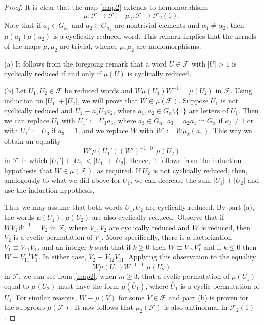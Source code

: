 \documentclass[10pt, reqno]{amsart}
\numberwithin{equation}{section}
\begin{document}
\begin{proof}
It is clear that the map \eqref{map2} extends to homomorphisms
 $$
 \mu : {\mathcal{F}} \to {\mathcal{F}} , \quad \mu_2 :  {\mathcal{F}} \to {\mathcal{F}}_2(1) .
 $$
Note that if $a_1 \in G_{{\alpha}_1}$ and $a_2 \in G_{{\alpha}_2}$ are nontrivial elements and ${\alpha}_1 \ne {\alpha}_2$, then
$\mu(a_1) \mu(a_2) $ is a cyclically reduced word. This remark implies that the kernels of the maps $\mu, \mu_2$ are trivial, whence $\mu, \mu_2$  are monomorphisms.
\smallskip

(a) It follows from the foregoing remark that  a word $U \in {\mathcal{F}}$ with $|U| >1$ is cyclically reduced if and only if $\mu(U)$ is cyclically reduced.
\smallskip

(b)  Let $U_1, U_2 \in {\mathcal{F}}$ be reduced words and
$W \mu(U_1) W^{-1} = \mu(U_2)$ in ${\mathcal{F}}$. Using induction on $|U_1| + |U_2|$, we will prove that $W \in \mu({\mathcal{F}})$. Suppose $U_1$ is not cyclically reduced and
$U_1 \equiv a_1 U_3 a_2$, where $a_1, a_2 \in G_{\alpha} \setminus \{ 1\}$ are letters of $U_1$. Then we can replace $U_1$ with $U_1' := U_3 a_3$, where $a_3 \in G_{\alpha}$,    $a_3 = a_2 a_1$ in $G_{\alpha}$ if  $a_3 \ne 1$ or with  $U_1' := U_3$ if $a_3 = 1$, and we replace $W$ with $W' := W \mu_2(a_1)$. This way we obtain an equality
$$
W' \mu(U_1') (W')^{-1} \overset 0 =  \mu(U_2)
$$
in ${\mathcal{F}}$ in which $|U_1'|+ |U_2| < |U_1| + |U_2|$. Hence, it follows from the induction hypothesis that $W \in \mu({\mathcal{F}})$, as required. If  $U_2$ is not cyclically reduced, then, analogously to what we did above for $U_1$, we can decrease the sum  $|U_1| + |U_2|$ and use the induction hypothesis.

Thus we may assume that both words $U_1, U_2$ are
cyclically reduced.  By part (a), the words $\mu(U_1)$, $\mu(U_2)$ are also cyclically reduced.  Observe that if $W V_1 W^{-1} = V_2$  in ${\mathcal{F}}$, where
$V_1, V_2$ are cyclically reduced and $W$ is reduced, then $V_2$ is a cyclic permutation of $V_1$. More specifically, there is a factorization $V_1 \equiv V_{11}V_{12}$ and an integer $k$ such that if $k \ge 0$ then $W \equiv V_{12}V_{1}^k$ and if  $k \le 0$ then $W \equiv V_{11}^{-1}V_{1}^k$. In either case, $V_2 \equiv V_{12} V_{11}$. Applying this observation to the equality
$$
W \mu(U_1) W^{-1} \overset 0 = \mu(U_2)
$$
in ${\mathcal{F}}$, we can see from \eqref{map2}, when $m \ge 3$,  that a cyclic permutation  of  $\mu(U_1)$ equal to $\mu(U_2)$ must have the form
$\mu(\bar U_1)$, where $\bar U_1$  is a cyclic permutation of $U_1$. For similar reasons, $W \equiv \mu(V)$  for some $V \in {\mathcal{F}}$ and part (b) is proven for the subgroup $\mu({\mathcal{F}})$. It now follows that $\mu_2({\mathcal{F}})$  is also antinormal in ${\mathcal{F}}_2(1)$.
\smallskip


\end{proof}
\end{document}
